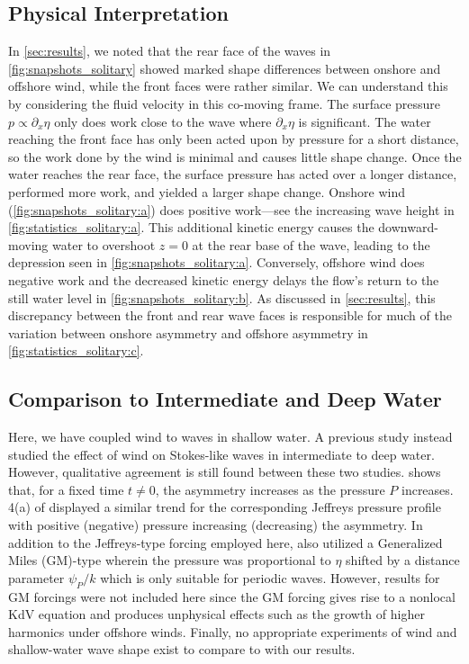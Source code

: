 \documentclass{jfm}
\begin{document}
\subsection{\label{sec:physical_reason} Physical Interpretation}
In \cref{sec:results}, we noted that the rear face of the waves in
\cref{fig:snapshots_solitary} showed marked shape differences between
onshore and offshore wind, while the front faces were rather similar.
We can understand this by considering the fluid velocity in this
co-moving frame.
The surface pressure $p \propto \partial_x \eta$ only does work
close to the wave where $\partial_x \eta$ is significant.
The water reaching the front face has only been acted upon by pressure
for a short distance, so the work done by the wind is minimal and causes
little shape change.
Once the water reaches the rear face, the surface pressure has acted
over a longer distance, performed more work, and yielded a larger shape
change.
Onshore wind (\cref{fig:snapshots_solitary:a}) does positive work---see
the increasing wave height in \cref{fig:statistics_solitary:a}.
This additional kinetic energy causes the downward-moving water to
overshoot $z=0$ at the rear base of the wave, leading to the depression
seen in \cref{fig:snapshots_solitary:a}.
Conversely, offshore wind does negative work and the decreased kinetic
energy delays the flow's return to the still water level in
\cref{fig:snapshots_solitary:b}.
As discussed in \cref{sec:results}, this discrepancy between the front
and rear wave faces is responsible for much of the variation between
onshore asymmetry and offshore asymmetry in
\cref{fig:statistics_solitary:c}.

\subsection{Comparison to Intermediate and Deep Water}
Here, we have coupled wind to waves in shallow water.
A previous study \citep{zdyrski2020wind} instead studied the effect of
wind on Stokes-like waves in intermediate to deep water.
However, qualitative agreement is still found between these two studies.
 shows that, for a fixed time $t \neq 0$,
the asymmetry increases as the pressure $P$ increases.
\Figname{} 4(a) of \citet{zdyrski2020wind} displayed a similar trend for
the corresponding Jeffreys pressure profile with positive (negative)
pressure increasing (decreasing) the asymmetry.
In addition to the Jeffreys-type forcing employed here,
\citet{zdyrski2020wind} also utilized a Generalized Miles (GM)-type
wherein the pressure was proportional to $\eta$ shifted by a distance
parameter $\psi_P/k$ which is only suitable for periodic waves.
However, results for GM forcings were not included here since the GM
forcing gives rise to a nonlocal KdV equation and produces unphysical
effects such as the growth of higher harmonics under offshore winds.
Finally, no appropriate experiments of wind and shallow-water wave shape
exist to compare to with our results.
\end{document}
